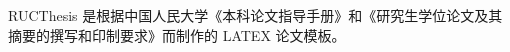 \begin{abstractzh}
RUCThesis 是根据中国人民大学《本科论文指导手册》和《研究生学位论文及其摘要的撰写和印制要求》而制作的 LATEX 论文模板。
\end{abstractzh}
